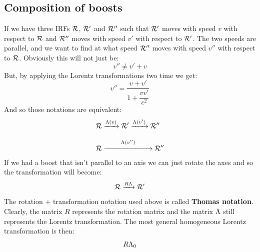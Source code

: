 \subsection{Composition of boosts}
If we have three IRFs $\mathcal{R}$, $\mathcal{R'}$ and $\mathcal{R''}$ such that $\mathcal{R'}$ moves with speed $v$ with respect to $\mathcal{R}$ and $\mathcal{R''}$ moves with speed $v'$ with respect to $\mathcal{R'}$. The two speeds are parallel, and we want to find at what speed $\mathcal{R''}$ moves with speed $v''$ with respect to $\mathcal{R}$. Obviously this will not just be:
\begin{equation}
  v'' \neq v' + v
\end{equation}
But, by applying the Lorentz transformations two time we get:
\begin{equation}
  v'' = \dfrac{v + v'}{1 + \dfrac{vv'}{c^2}}
\end{equation}
And so those notations are equivalent:
\begin{equation}
  \begin{split}
    &\irf{R} \xrightarrow{\lm(v)} \irf{R'} \xrightarrow{\lm(v')} \irf{R''}\\[8pt]
    &\irf{R} \overset{\lm(v'')}{\xrightarrow{\makebox[2.25cm]{}}} \irf{R''}
  \end{split}
\end{equation}
If we had a boost that isn't parallel to an axis we can just rotate the axes and so the transformation will become:
\begin{equation}
  \mathcal{R} \xrightarrow{R\Lambda} \mathcal{R'}
\end{equation}
The rotation + transformation notation used above is called \textbf{Thomas notation}. Clearly, the matrix $R$ represents the rotation matrix and the matrix $\Lambda$ still represents the Lorentz transformation. The most general homogeneous Lorentz transformation is then:
\begin{equation}
  R\Lambda_0
\end{equation}
